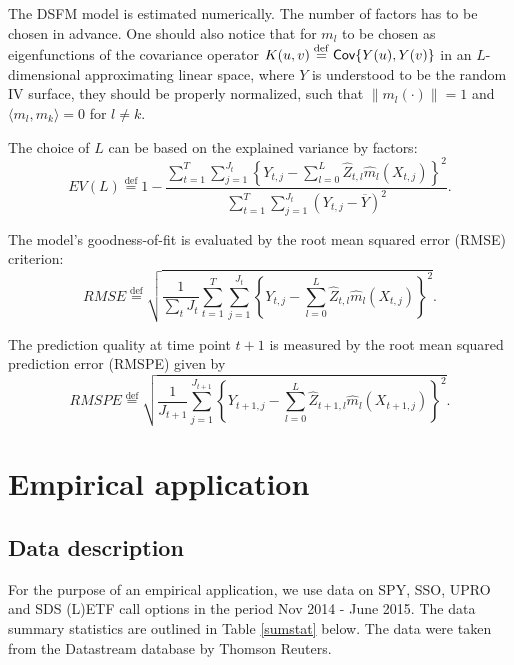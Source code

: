 \documentclass{rQUF2e}
\newcommand{\Cov}{\mathop{\mbox{\sf Cov}}}
\theoremstyle{plain}
\theoremstyle{definition}
\begin{document}
	The DSFM model is estimated numerically. The number of factors has to be chosen in advance. One should also notice that for $m_l$ to be chosen as eigenfunctions of the covariance operator $K(u,v) \stackrel{\operatorname{def}}{=} \Cov \{Y(u),Y(v)\}$ in an $L$-dimensional approximating linear space, where $Y$ is understood to be the random IV surface, they should be properly normalized, such that $\|m_l(\cdot)\| = 1$ and $\langle m_l,m_k \rangle = 0$ for $l \neq k$.
	
	The choice of $L$ can be based on the explained variance by factors:
	\begin{equation}
	EV(L) \stackrel{\operatorname{def}}{=} 1 - \frac{\sum_{t=1}^{T} \sum_{j=1}^{J_t} \left\{Y_{t,j} - \sum_{l=0}^{L} \widehat{Z}_{t,l}\widehat{m}_l(X_{t,j})\right\}^2 }{\sum_{t=1}^{T} \sum_{j=1}^{J_t} (Y_{t,j} - \overline{Y})^2}.
	\label{explvar}
	\end{equation}  
	
	The model's goodness-of-fit is evaluated by the root mean squared error (RMSE) criterion: 
	\begin{equation}
	RMSE \stackrel{\operatorname{def}}{=} \sqrt{\frac{1}{\sum_t J_t}\sum_{t=1}^{T} \sum_{j=1}^{J_t} \left\{Y_{t,j} - \sum_{l=0}^{L} \widehat{Z}_{t,l}\widehat{m}_l(X_{t,j})\right\}^2 }.
	\label{rmsecrit}
	\end{equation} 
	
	The prediction quality at time point $t+1$ is measured by the root mean squared prediction error (RMSPE) given by
	\begin{equation}
	RMSPE \stackrel{\operatorname{def}}{=} \sqrt{\frac{1}{J_{t+1}} \sum_{j=1}^{J_{t+1}} \left\{Y_{t+1,j} - \sum_{l=0}^{L} \widehat{Z}_{t+1,l}\widehat{m}_l(X_{t+1,j})\right\}^2 }.
	\label{rmspecrit}
	\end{equation} 
	
	
	
	\section{Empirical application}
	\label{empirical_section}
	
	\subsection{Data description}
	
	For the purpose of an empirical application, we use data on SPY, SSO, UPRO and SDS (L)ETF call options in the period Nov 2014 - June 2015. The data summary statistics are outlined in Table \ref{sumstat} below. The data were taken from the Datastream database by Thomson Reuters. 
	
\end{document}
